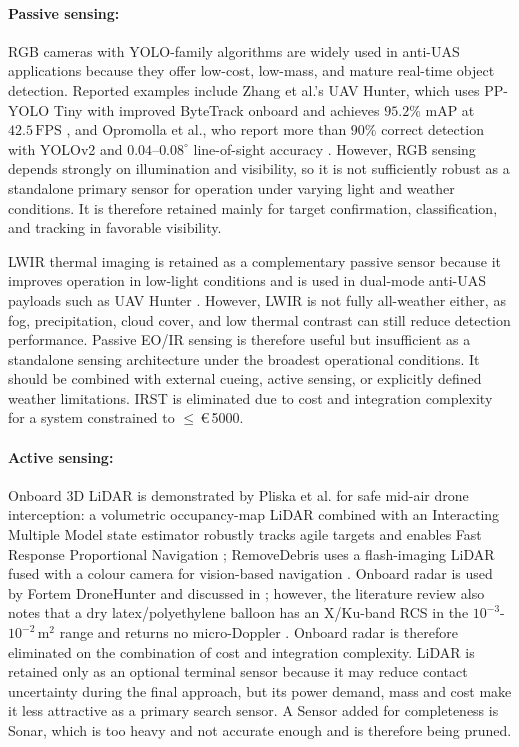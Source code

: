 \paragraph{Passive sensing:}
RGB cameras with YOLO-family algorithms are widely used in anti-UAS applications because they offer low-cost, low-mass, and mature real-time object detection. Reported examples include Zhang et al.'s UAV Hunter, which uses PP-YOLO Tiny with improved ByteTrack onboard and achieves $95.2\%$ mAP at $42.5\,\mathrm{FPS}$ \cite{Zhang2024UAVDefense}, and Opromolla et al., who report more than $90\%$ correct detection with YOLOv2 and $0.04$--$0.08^\circ$ line-of-sight accuracy \cite{Opromolla2019AirborneLearning}. However, RGB sensing depends strongly on illumination and visibility, so it is not sufficiently robust as a standalone primary sensor for operation under varying light and weather conditions. It is therefore retained mainly for target confirmation, classification, and tracking in favorable visibility.

LWIR thermal imaging is retained as a complementary passive sensor because it improves operation in low-light conditions and is used in dual-mode anti-UAS payloads such as UAV Hunter \cite{Zhang2024UAVDefense}. However, LWIR is not fully all-weather either, as fog, precipitation, cloud cover, and low thermal contrast can still reduce detection performance. Passive EO/IR sensing is therefore useful but insufficient as a standalone sensing architecture under the broadest operational conditions. It should be combined with external cueing, active sensing, or explicitly defined weather limitations. IRST is eliminated due to cost and integration complexity for a system constrained to $\leq$\,\euro\,5000.
\vspace{-10pt}

\paragraph{Active sensing:} Onboard 3D LiDAR is demonstrated by Pliska et al. for safe mid-air drone interception: a volumetric occupancy-map LiDAR combined with an Interacting Multiple Model state estimator robustly tracks agile targets and enables Fast Response Proportional Navigation \cite{Pliska2024TowardsCapture}; RemoveDebris uses a flash-imaging LiDAR fused with a colour camera for vision-based navigation \cite{Forshaw2020TheLaunch}. Onboard radar is used by Fortem DroneHunter \cite{Fortem} and discussed in \cite{Parry2023ReviewAircraft}; however, the literature review also notes that a dry latex/polyethylene balloon has an X/Ku-band RCS in the $10^{-3}$-$10^{-2}\,\mathrm{m}^2$ range and returns no micro-Doppler \cite{Fortem}. Onboard radar is therefore eliminated on the combination of cost and integration complexity. LiDAR is retained only as an optional terminal sensor because it may reduce contact uncertainty during the final approach, but its power demand, mass and cost make it less attractive as a primary search sensor. A Sensor added for completeness is Sonar, which is too heavy and not accurate enough and is therefore being pruned.

